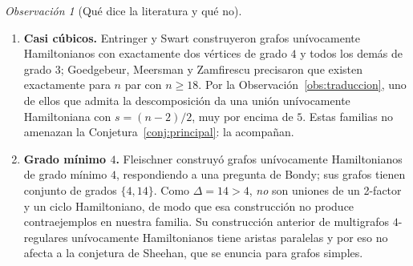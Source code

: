 \documentclass[11pt,a4paper]{article}
\theoremstyle{definition}
\theoremstyle{remark}
\newtheorem{observacion}[teorema]{Observación}
\begin{document}
\begin{observacion}[Qué dice la literatura y qué no]\label{obs:literaturaUH}
\begin{enumerate}[label=(\arabic*)]
\item \textbf{Casi cúbicos.} Entringer y Swart \cite{es80} construyeron grafos unívocamente Hamiltonianos con exactamente dos vértices de grado $4$ y todos los demás de grado $3$; Goedgebeur, Meersman y Zamfirescu \cite{gmz20} precisaron que existen exactamente para $n$ par con $n\ge18$. Por la Observación~\ref{obs:traduccion}, uno de ellos que admita la descomposición da una unión unívocamente Hamiltoniana con $s=(n-2)/2$, muy por encima de $5$. Estas familias no amenazan la Conjetura~\ref{conj:principal}: la acompañan.

\item \textbf{Grado mínimo $4$.} Fleischner \cite{fleischner14} construyó grafos unívocamente Hamiltonianos de grado mínimo $4$, respondiendo a una pregunta de Bondy; sus grafos tienen conjunto de grados $\{4,14\}$. Como $\Delta=14>4$, \emph{no} son uniones de un 2-factor y un ciclo Hamiltoniano, de modo que esa construcción no produce contraejemplos en nuestra familia. Su construcción anterior \cite{fleischner94} de multigrafos $4$-regulares unívocamente Hamiltonianos tiene aristas paralelas y por eso no afecta a la conjetura de Sheehan, que se enuncia para grafos simples.


\end{enumerate}
\end{observacion}
\end{document}
